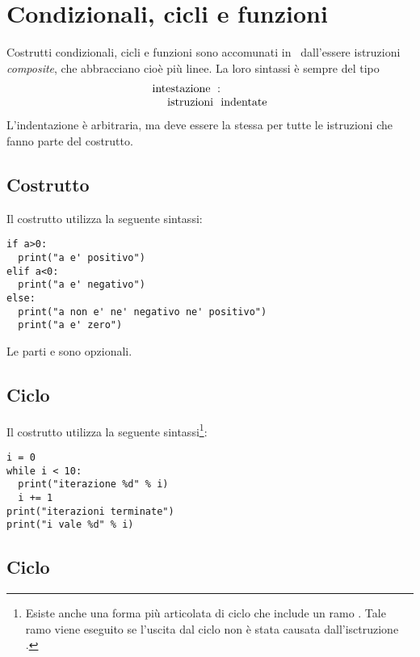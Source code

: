 \chapter{Condizionali, cicli e funzioni}
\label{condizionali-cicli-funzioni}

Costrutti condizionali, cicli e funzioni sono accomunati in \python\ 
dall'essere istruzioni \emph{composite}, che abbracciano cio\`e pi\`u
linee. La loro sintassi \`e sempre del tipo
\[
\begin{array}{l}
\textrm{intestazione}\,\,: \\
\,\,\,\,\,\,\,\,\textrm{istruzioni\,\, indentate}
\end{array}
\]
L'indentazione \`e arbitraria, ma deve essere la
stessa per tutte le istruzioni che fanno parte del costrutto.

\section{Costrutto     }

Il costrutto  utilizza la seguente sintassi:
\begin{verbatim}
if a>0:
  print("a e' positivo")
elif a<0:
  print("a e' negativo")
else:
  print("a non e' ne' negativo ne' positivo")
  print("a e' zero")
\end{verbatim}
Le parti  e  sono opzionali.

\section{Ciclo }

Il costrutto  utilizza la seguente sintassi\footnote{
Esiste anche una forma pi\`u articolata di ciclo \istr{while} che
include un ramo \istr{else}. Tale ramo viene eseguito se l'uscita dal
ciclo non \`e stata causata dall'isctruzione \istr{break}.}:
\begin{verbatim}
i = 0
while i < 10:
  print("iterazione %d" % i)
  i += 1
print("iterazioni terminate")
print("i vale %d" % i)
\end{verbatim}

\section{Ciclo }

